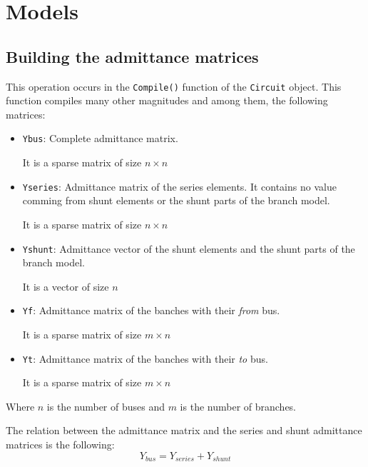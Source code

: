 \documentclass[11pt,fleqn]{book} %
\begin{document}
\chapter{Models}



\section{Building the admittance matrices}

This operation occurs in the \verb|Compile()| function of the \verb|Circuit| object. This function compiles many other magnitudes and among them, the following matrices:

\begin{itemize}
	\item \verb|Ybus|: Complete admittance matrix.
	
	It is a sparse matrix of size $n \times n$
	
	\item \verb|Yseries|: Admittance matrix of the series elements. It contains no value comming from shunt elements or the shunt parts of the branch model.
	
	It is a sparse matrix of size $n \times n$
	
	\item \verb|Yshunt|: Admittance vector of the shunt elements and the shunt parts of the branch model. 
	
	It is a vector of size $n$
	
	\item \verb|Yf|: Admittance matrix of the banches with their \textit{from} bus.
	
	It is a sparse matrix of size $m \times n$
	 
	\item \verb|Yt|: Admittance matrix of the banches with their \textit{to} bus.
	
	It is a sparse matrix of size $m \times n$\newline
\end{itemize}

Where $n$ is the number of buses and $m$ is the number of branches.

The relation between the admittance matrix and the series and shunt admittance matrices is the following:
\begin{equation}
Y_{bus} = Y_{series} + Y_{shunt}
\end{equation}
\end{document}
